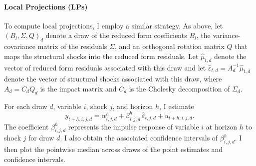 \documentclass[12pt]{article}
\begin{document}
\paragraph{Local Projections (LPs)}

To compute local projections, I employ a similar strategy. As above, let $(B_l, \Sigma, Q)_d$ denote a draw of  the reduced form coefficients $B_l$, the variance-covariance matrix of the residuals $\Sigma$, and an orthogonal rotation matrix $Q$ that maps the structural shocks into the reduced form residuals. Let $\hat \mu_{t,d}$ denote the vector of reduced form residuals associated with this draw and let $\hat \varepsilon_{t,d} = A_d^{-1}\hat \mu_{t,d}$ denote the vector of structural shocks associated with this draw, where $A_d = C_d Q_d$ is the impact matrix and $C_d$ is the Cholesky decomposition of $\Sigma_d$.

For each draw $d$, variable $i$, shock $j$, and horizon $h$, I estimate
$$ y_{t+h,i,j,d} = \alpha^h_{i,j,d} + \beta^h_{i,j,d}\,\hat \varepsilon_{t,j,d} + u_{t+h,i,j,d} \text{.} $$
The coefficient $\beta^h_{i,j,d}$ represents the impulse response of variable $i$ at horizon $h$ to shock $j$ for draw $d$. I also obtain the associated confidence intervals of $\beta^h_{i,j,d}$. I then plot the pointwise median across draws of the point estimates and confidence intervals.
\end{document}
